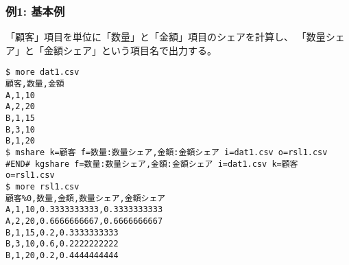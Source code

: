 \subsubsection*{例1: 基本例}

「顧客」項目を単位に「数量」と「金額」項目のシェアを計算し、
「数量シェア」と「金額シェア」という項目名で出力する。


\begin{Verbatim}[baselinestretch=0.7,frame=single]
$ more dat1.csv
顧客,数量,金額
A,1,10
A,2,20
B,1,15
B,3,10
B,1,20
$ mshare k=顧客 f=数量:数量シェア,金額:金額シェア i=dat1.csv o=rsl1.csv
#END# kgshare f=数量:数量シェア,金額:金額シェア i=dat1.csv k=顧客 o=rsl1.csv
$ more rsl1.csv
顧客%0,数量,金額,数量シェア,金額シェア
A,1,10,0.3333333333,0.3333333333
A,2,20,0.6666666667,0.6666666667
B,1,15,0.2,0.3333333333
B,3,10,0.6,0.2222222222
B,1,20,0.2,0.4444444444
\end{Verbatim}
